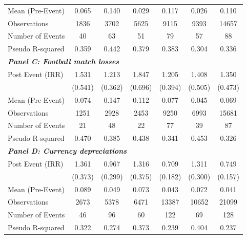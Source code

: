 {\begin{tabular}{l*{6}{c}}
Mean (Pre-Event)&       0.065         &       0.140         &       0.029         &       0.117         &       0.026         &       0.110         \\
Observations&        1836         &        3702         &        5625         &        9115         &        9393         &       14657         \\
Number of Events&          40         &          63         &          51         &          79         &          57         &          88         \\
Pseudo R-squared&       0.359         &       0.442         &       0.379         &       0.383         &       0.304         &       0.336         \\
\bottomrule
\multicolumn{7}{l}{\textbf{\textit{Panel C: Football match losses}}} \\
Post Event (IRR)&       1.531         &       1.213         &       1.847         &       1.205         &       1.408         &       1.350         \\
&     (0.541)         &     (0.362)         &     (0.696)         &     (0.394)         &     (0.505)         &     (0.473)         \\
\midrule
Mean (Pre-Event)&       0.074         &       0.147         &       0.112         &       0.077         &       0.045         &       0.069         \\
Observations&        1251         &        2928         &        2453         &        9250         &        6993         &       15681         \\
Number of Events&          21         &          48         &          22         &          77         &          39         &          87         \\
Pseudo R-squared&       0.470         &       0.385         &       0.438         &       0.341         &       0.453         &       0.326         \\
\bottomrule
\multicolumn{7}{l}{\textbf{\textit{Panel D: Currency depreciations}}} \\
Post Event (IRR)&       1.361         &       0.967         &       1.316         &       0.709         &       1.311         &       0.749         \\
&     (0.373)         &     (0.299)         &     (0.375)         &     (0.182)         &     (0.300)         &     (0.157)         \\
\midrule
Mean (Pre-Event)&       0.089         &       0.049         &       0.073         &       0.043         &       0.072         &       0.041         \\
Observations&        2673         &        5378         &        6471         &       13387         &       10652         &       21099         \\
Number of Events&          46         &          96         &          60         &         122         &          69         &         128         \\
Pseudo R-squared&       0.322         &       0.274         &       0.373         &       0.239         &       0.404         &       0.237         \\
\bottomrule
\end{tabular}
}

